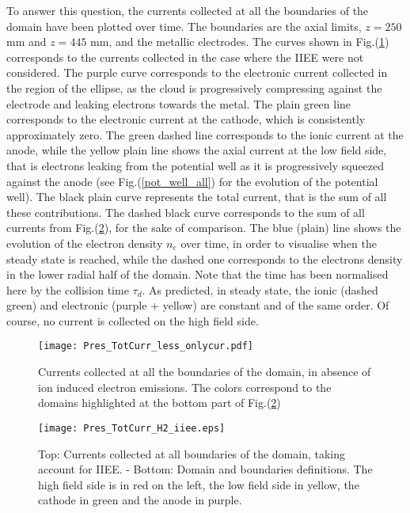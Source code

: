 To answer this question, the currents collected at all the boundaries of the domain have been plotted over time. The boundaries are the axial limits, $z=250$ mm and $z=445$ mm, and the metallic electrodes. The curves shown in Fig.(\ref{TotCurr_less}) corresponds to the currents collected in the case where the IIEE were not considered. The purple curve corresponds to the electronic current collected in the region of the ellipse, as the cloud is progressively compressing against the electrode and leaking electrons towards the metal. The plain green line corresponds to the electronic current at the cathode, which is consistently approximately zero. The green dashed line corresponds to the ionic current at the anode, while the yellow plain line shows the axial current at the low field side, that is electrons leaking from the potential well as it is progressively squeezed against the anode (see Fig.(\ref{pot_well_all}) for the evolution of the potential well). The black plain curve represents the total current, that is the sum of all these contributions. The dashed black curve corresponds to the sum of all currents from Fig.(\ref{TotCurr_H2}), for the sake of comparison. The blue (plain) line shows the evolution of the electron density $n_e$ over time, in order to visualise when the steady state is reached, while the dashed one corresponds to the electrons density in the lower radial half of the domain. Note that the time has been normalised here by the collision time $\tau_d$. As predicted, in steady state, the ionic (dashed green) and electronic (purple + yellow) are constant  and of the same order. Of course, no current is collected on the high field side. \\

\begin{figure}[h!]
\centering
	\texttt{[image: Pres\_TotCurr\_less\_onlycur.pdf]}
	\caption{\label{TotCurr_less} Currents collected at all the boundaries of the domain, in absence of ion induced electron emissions. The colors correspond to the domains highlighted at the bottom part of  Fig.(\ref{TotCurr_H2})}
\end{figure} 

\begin{figure}[h!]
\centering
	\texttt{[image: Pres\_TotCurr\_H2\_iiee.eps]}
	\caption{\label{TotCurr_H2} Top: Currents collected at all boundaries of the domain, taking account for IIEE. - Bottom: Domain and boundaries definitions. The high field side is in red on the left, the low field side in yellow, the cathode in green and the anode in purple.}
\end{figure} 

